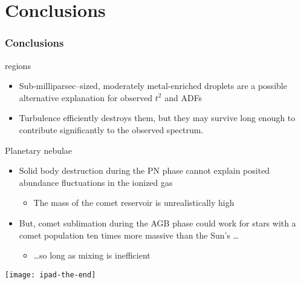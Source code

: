 \documentclass[presentation, compress]{beamer}
\begin{document}
\section{Conclusions}
\label{sec-9}

\begin{frame}
  \frametitle{Conclusions}
  \begin{overprint}
    \begin{alertblock}{\hii{} regions}
      \begin{itemize}
      \item Sub-milliparsec--sized, moderately metal-enriched droplets are a possible
        alternative explanation for observed \(t^2\) and ADFs
      \item Turbulence efficiently destroys them, but they may survive long enough to contribute significantly to the observed spectrum. 
      \end{itemize}
    \end{alertblock}
    \begin{alertblock}{Planetary nebulae}
      \begin{itemize}
      \item Solid body destruction during the PN phase cannot explain posited abundance fluctuations in the ionized gas
        \begin{itemize}
        \item The mass of the comet reservoir is unrealistically high
        \end{itemize}
      \item But, comet sublimation during the AGB phase could work for stars with a comet population ten times more massive than the Sun's \dots 
        \begin{itemize}
        \item \dots so long as mixing is inefficient 
        \end{itemize}
      \end{itemize}
    \end{alertblock}
  \end{overprint}
\end{frame}

\begin{frame}[plain]
  \texttt{[image: ipad-the-end]}
\end{frame}
\end{document}
